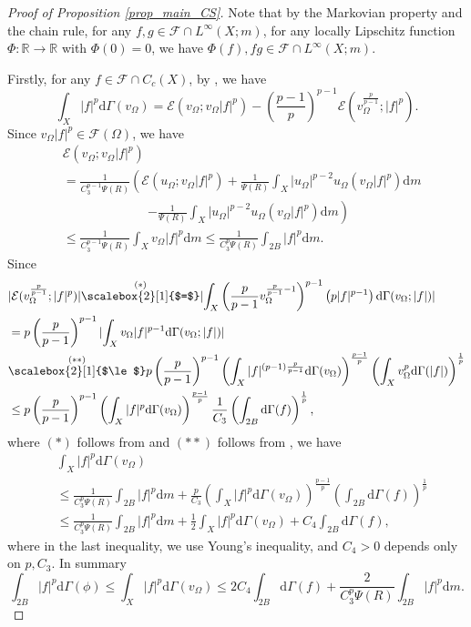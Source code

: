 \documentclass[11pt,a4paper]{article}
\numberwithin{equation}{section}
\theoremstyle{plain}
\theoremstyle{definition}
\begin{document}
\begin{proof}[Proof of Proposition \ref{prop_main_CS}]
Note that by the Markovian property and the chain rule, for any $f,g\in \mathcal{F}\cap L^\infty(X;m)$, for any locally Lipschitz function $\Phi:\mathbb{R}\to \mathbb{R}$ with $\Phi(0)=0$, we have $\Phi(f),fg\in \mathcal{F}\cap L^\infty(X;m)$.

Firstly, for any $f\in \mathcal{F}\cap C_c(X)$, by \cite[Proposition 4.16]{KS24a}, we have
$$\int_{X}|f|^p\mathrm{d}\Gamma(v_\Omega)=\mathcal{E}(v_\Omega;v_\Omega|f|^p)-\left(\frac{p-1}{p}\right)^{p-1}\mathcal{E}(v_\Omega^{\frac{p}{p-1}};|f|^p).$$
Since $v_\Omega|f|^p\in \mathcal{F}(\Omega)$, we have
\begin{align*}
&\mathcal{E}(v_\Omega;v_\Omega|f|^p)\\
&=\frac{1}{C_3^{p-1}\Psi(R)}\left(\mathcal{E}(u_\Omega;v_\Omega|f|^p)+\frac{1}{\Psi(R)}\int_X|u_\Omega|^{p-2}u_\Omega(v_\Omega|f|^p)\mathrm{d} m\right.\\
&\hspace{80pt}\left.-\frac{1}{\Psi(R)}\int_X|u_\Omega|^{p-2}u_\Omega(v_\Omega|f|^p)\mathrm{d} m\right)\\
&\le\frac{1}{C_3^{p-1}\Psi(R)}\int_Xv_\Omega|f|^p\mathrm{d} m\le\frac{1}{C_3^{p}\Psi(R)}\int_{2B}|f|^p\mathrm{d} m.
\end{align*}
Since
\begin{align*}
&\lvert\mathcal{E}(v_\Omega^{\frac{p}{p-1}};|f|^p)\rvert\overset{(*)}{\scalebox{2}[1]{$=$}}\lvert\int_X \left(\frac{p}{p-1}v_\Omega^{\frac{p}{p-1}-1}\right)^{p-1}\left(p|f|^{p-1}\right)\mathrm{d}\Gamma(v_\Omega;|f|)\rvert\\
&=p \left(\frac{p}{p-1}\right)^{p-1}\lvert\int_Xv_\Omega|f|^{p-1}\mathrm{d}\Gamma(v_\Omega;|f|)\rvert\\
&\overset{(**)}{\scalebox{2}[1]{$\le$}}p \left(\frac{p}{p-1}\right)^{p-1}\left(\int_X|f|^{(p-1)\frac{p}{p-1}}\mathrm{d}\Gamma(v_\Omega)\right)^{\frac{p-1}{p}}\left(\int_Xv_\Omega^p\mathrm{d}\Gamma(|f|)\right)^{\frac{1}{p}}\\
&\le p \left(\frac{p}{p-1}\right)^{p-1}\left(\int_X|f|^{p}\mathrm{d}\Gamma(v_\Omega)\right)^{\frac{p-1}{p}}\frac{1}{C_3}\left(\int_{2B}\mathrm{d}\Gamma(f)\right)^{\frac{1}{p}},
\end{align*}
where $(*)$ follows from \cite[Theorem 7.6]{Sas26} and $(**)$ follows from \cite[Proposition 4.8]{KS24a}, we have
\begin{align*}
&\int_X|f|^p\mathrm{d}\Gamma(v_\Omega)\\
&\le\frac{1}{C_3^{p}\Psi(R)}\int_{2B}|f|^p\mathrm{d} m+\frac{p}{C_3} \left(\int_X|f|^{p}\mathrm{d}\Gamma(v_\Omega)\right)^{\frac{p-1}{p}}\left(\int_{2B}\mathrm{d}\Gamma(f)\right)^{\frac{1}{p}}\\
&\le\frac{1}{C_3^{p}\Psi(R)}\int_{2B}|f|^p\mathrm{d} m+\frac{1}{2}\int_X|f|^{p}\mathrm{d}\Gamma(v_\Omega)+C_4\int_{2B}\mathrm{d}\Gamma(f),
\end{align*}
where in the last inequality, we use Young's inequality, and $C_4>0$ depends only on $p,C_3$. In summary
$$\int_{2B}|f|^p\mathrm{d}\Gamma(\phi)\le\int_{X}|f|^p\mathrm{d}\Gamma(v_\Omega)\le 2C_4\int_{2B}\mathrm{d}\Gamma(f)+\frac{2}{C_3^{p}\Psi(R)}\int_{2B}|f|^p\mathrm{d} m.$$


\end{proof}
\end{document}
